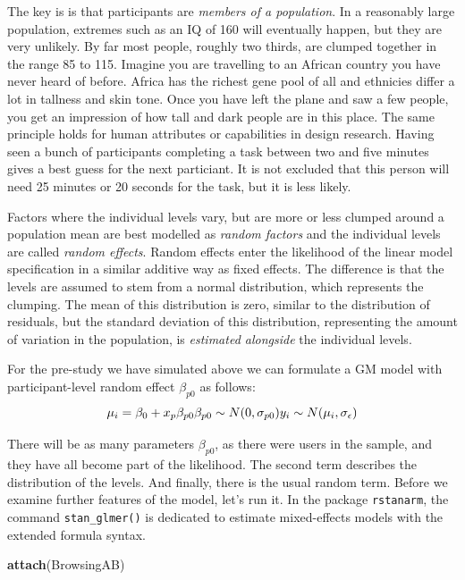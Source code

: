 \documentclass[]{svmono}
\newenvironment{Shaded}{\begin{snugshade}}{\end{snugshade}}
\newcommand{\KeywordTok}[1]{\textcolor[rgb]{0.13,0.29,0.53}{\textbf{#1}}}
\newcommand{\NormalTok}[1]{#1}
\begin{document}
The key is is that participants are \emph{members of a population}. In a
reasonably large population, extremes such as an IQ of 160 will
eventually happen, but they are very unlikely. By far most people,
roughly two thirds, are clumped together in the range 85 to 115. Imagine
you are travelling to an African country you have never heard of before.
Africa has the richest gene pool of all and ethnicies differ a lot in
tallness and skin tone. Once you have left the plane and saw a few
people, you get an impression of how tall and dark people are in this
place. The same principle holds for human attributes or capabilities in
design research. Having seen a bunch of participants completing a task
between two and five minutes gives a best guess for the next particiant.
It is not excluded that this person will need 25 minutes or 20 seconds
for the task, but it is less likely.

Factors where the individual levels vary, but are more or less clumped
around a population mean are best modelled as \emph{random factors} and
the individual levels are called \emph{random effects}. Random effects
enter the likelihood of the linear model specification in a similar
additive way as fixed effects. The difference is that the levels are
assumed to stem from a normal distribution, which represents the
clumping. The mean of this distribution is zero, similar to the
distribution of residuals, but the standard deviation of this
distribution, representing the amount of variation in the population, is
\emph{estimated alongside} the individual levels.

For the pre-study we have simulated above we can formulate a GM model
with participant-level random effect \(\beta_{p0}\) as follows: \[
\mu_i = \beta_0 + x_p\beta_{p0}\\
\beta_{p0} \sim N(0, \sigma_{p0})\\
y_i \sim N(\mu_i, \sigma_\epsilon)
\]

There will be as many parameters \(\beta_{p0}\), as there were users in
the sample, and they have all become part of the likelihood. The second
term describes the distribution of the levels. And finally, there is the
usual random term. Before we examine further features of the model,
let's run it. In the package \texttt{rstanarm}, the command
\texttt{stan\_glmer()} is dedicated to estimate mixed-effects models
with the extended formula syntax.

\begin{Shaded}
\begin{Highlighting}[]
\KeywordTok{attach}\NormalTok{(BrowsingAB)}
\end{Highlighting}
\end{Shaded}
\end{document}
